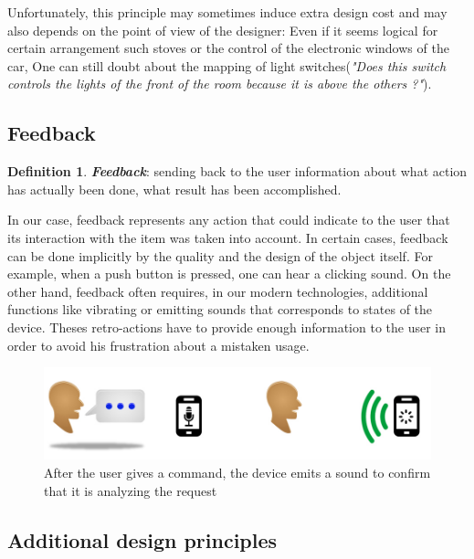 \documentclass[a4paper,11pt] {article}
\theoremstyle{definition}
\begin{document}
Unfortunately, this principle may sometimes induce extra design cost and may also depends on the point of view of the designer: Even if it seems logical for certain arrangement such stoves or the control of the electronic windows of the car, One can still doubt about the mapping of light switches(\textit{"Does this switch controls  the lights of the front of the room because it is above the others ?"}).

    \subsection{Feedback}
\newtheorem{mydef}{Definition}
\begin{mydef}
\textit{\textbf{Feedback}}: sending back to the user information about what action has actually been done, what result has been accomplished.
\cite{Norman02}
\end{mydef}

In our case, feedback represents any action that could indicate to the user that its interaction with the item was taken into account. In certain cases, feedback can be done implicitly by the quality and the design of the object itself. For example, when a push button is  pressed, one can hear a clicking sound. On the other hand, feedback often requires, in our modern technologies, additional functions like vibrating or emitting sounds that corresponds to states of the device. Theses retro-actions have to provide enough information to the user in order to avoid his frustration about a mistaken usage.

\begin{figure}[h]
\centering
\includegraphics[scale=0.5]{fig-report/retro-action-speaking.jpg}
\caption{After the user gives a command, the device emits a sound to confirm that it is analyzing the request}
\end{figure}

    \subsection{Additional design principles}
\end{document}
